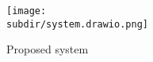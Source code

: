 \begin{figure}[t]
    \centering
    \texttt{[image: \\subdir/system.drawio.png]}
    \caption{Proposed system}
    \label{fig:system}
\end{figure}




